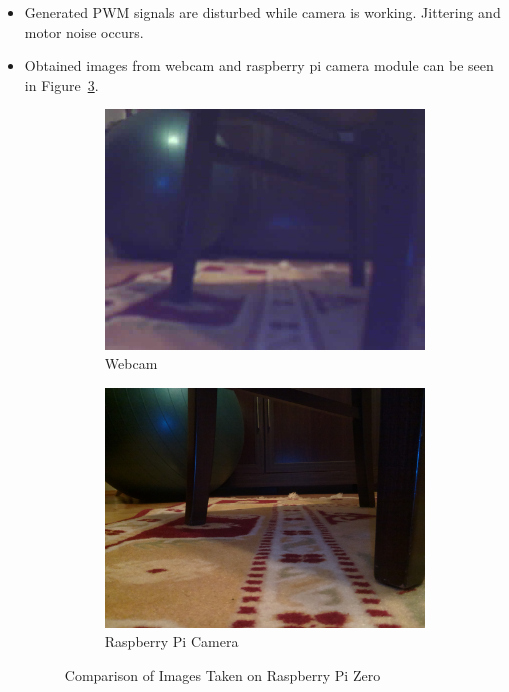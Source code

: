 \begin{itemize}
\item Generated PWM signals are disturbed while camera is working. Jittering and motor noise occurs. 

\item Obtained images from webcam and raspberry pi camera module can be seen in Figure~\ref{fig:camimages}.

\begin{figure}[ht]
     \centering
     \begin{subfigure}[b]{0.49\textwidth}
     \includegraphics[width=\linewidth]{img/WebCamRPi.jpg}
     \caption{Webcam}
     \label{fig:webcam}
     \end{subfigure}
     \begin{subfigure}[b]{0.49\textwidth}
     \includegraphics[width=\linewidth]{img/PiCamera.jpg}
     \caption {Raspberry Pi Camera}
     \label{fig:picam}
     \end{subfigure}
     \caption{Comparison of Images Taken on Raspberry Pi Zero}
     \label{fig:camimages}
\end{figure}


\end{itemize}
